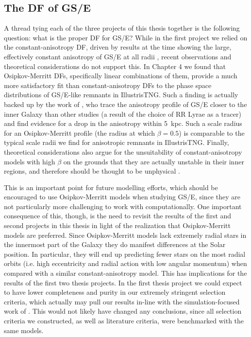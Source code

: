 \subsection{The DF of GS/E}

A thread tying each of the three projects of this thesis together is the following question: what is the proper DF for GS/E? While in the first project we relied on the constant-anisotropy DF, driven by results at the time showing the large, effectively constant anisotropy of GS/E at all radii \parencite[e.g.][]{belokurov18,lancaster19}, recent observations and theoretical considerations do not support this. In Chapter 4 we found that Osipkov-Merritt DFs, specifically linear combinations of them, provide a much more satisfactory fit than constant-anisotropy DFs to the phase space distributions of GS/E-like remnants in IllustrisTNG. Such a finding is actually backed up by the work of \textcite{iorio21}, who trace the anisotropy profile of GS/E closer to the inner Galaxy than other studies (a result of the choice of RR Lyrae as a tracer) and find evidence for a drop in the anisotropy within 5~kpc. Such a scale radius for an Osipkov-Merritt profile (the radius at which $\beta=0.5$) is comparable to the typical scale radii we find for anisotropic remnants in IllustrisTNG. Finally, theoretical considerations also argue for the unsuitability of constant-anisotropy models with high $\beta$ on the grounds that they are actually unstable in their inner regions, and therefore should be thought to be unphysical \parencite[see][and references therein]{binney14d}.

This is an important point for future modelling efforts, which should be encouraged to use Osipkov-Merritt models when studying GS/E, since they are not particularly more challenging to work with computationally. One important consequence of this, though, is the need to revisit the results of the first and second projects in this thesis in light of the realization that Osipkov-Merritt models are preferred. Since Osipkov-Merritt models lack extremely radial stars in the innermost part of the Galaxy they do manifest differences at the Solar position. In particular, they will end up predicting fewer stars on the most radial orbits (i.e. high eccentricity and radial action with low angular momentum) when compared with a similar constant-anisotropy model. This has implications for the results of the first two thesis projects. In the first thesis project we could expect to have lower completeness and purity in our extremely stringent selection criteria, which actually may pull our results in-line with the simulation-focused work of \textcite{carrillo23}. This would not likely have changed any conclusions, since all selection criteria we constructed, as well as literature criteria, were benchmarked with the same models.

